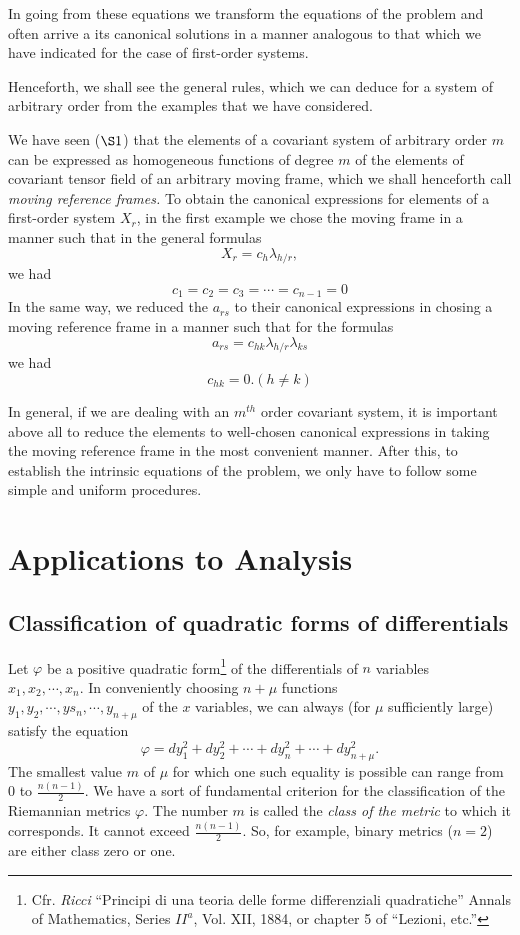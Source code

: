 \documentclass{book}
\begin{document}
In going from these equations we transform the equations of the problem and often arrive a its canonical solutions in a manner analogous to that which we have indicated for the case of first-order systems. 

Henceforth, we shall see the general rules, which we can deduce for a system of arbitrary order from the examples that we have considered.

We have seen ($\S1$) that the elements of a covariant system of arbitrary order $m$ can be expressed as homogeneous functions of degree $m$ of the elements of covariant tensor field of an arbitrary moving frame, which we shall henceforth call \emph{moving reference frames.} To obtain the canonical expressions for elements of a first-order system $X_r$, in the first example we chose the moving frame in a manner such that in the general formulas
$$X_r=c_h\lambda_{h/r},$$
we had
$$c_1=c_2=c_3=\cdots=c_{n-1}=0$$
In the same way, we reduced the $a_{rs}$ to their canonical expressions in chosing a moving reference frame in a manner such that for the formulas
$$a_{rs}=c_{hk}\lambda_{h/r}\lambda_{ks}$$
we had
$$c_{hk}=0. (h\neq k)$$

In general, if we are dealing with an $m^{th}$ order covariant system, it is important above all to reduce the elements to well-chosen canonical expressions in taking the moving reference frame in the most convenient manner. After this, to establish the intrinsic equations of the problem, we only have to follow some simple and uniform procedures.

\chapter{Applications to Analysis}
\section{Classification of quadratic forms of differentials}
Let $\varphi$ be a positive quadratic form\footnote{Cfr. \emph{Ricci} ``Principi di una teoria delle forme differenziali quadratiche'' Annals of Mathematics, Series $II^a$, Vol. XII, 1884, or chapter 5 of ``Lezioni, etc.''} of the differentials of $n$ variables \\$x_1,x_2,\cdots,x_n$. In conveniently choosing $n+\mu$ functions \\$y_1,y_2,\cdots,ys_n,\cdots,y_{n+\mu}$ of the $x$ variables, we can always (for $\mu$ sufficiently large) satisfy the equation 
$$\varphi=dy_1^2+dy_2^2+\cdots+dy_n^2+\cdots+dy_{n+\mu}^2.$$
The smallest value $m$ of $\mu$ for which one such equality is possible can range from 0 to $\frac{n(n-1)}{2}$. We have a sort of fundamental criterion for the classification of the Riemannian metrics $\varphi$. The number $m$ is called the \emph{class of the metric} to which it corresponds. It cannot exceed $\frac{n(n-1)}{2}$. So, for example, binary metrics ($n=2$) are either class zero or one. 
\end{document}
